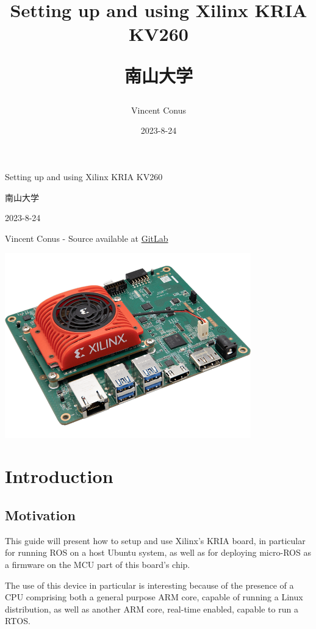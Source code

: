 \documentclass[10pt]{article}
\author{Vincent Conus}
\date{2023-8-24}
\title{Setting up and using Xilinx KRIA KV260\\\medskip
\large \begin{CJK}{UTF8}{min}南山大学\end{CJK}}
\newcommand{\gitlab}[1]{%
\href{#1}{GitLab \faGitlab}}
\begin{document}
\begin{titlepage}
\centering
{\LARGE Setting up and using Xilinx KRIA KV260 \par }
\vspace{5mm}
{\large \begin{CJK}{UTF8}{min}南山大学\end{CJK} \par}
\vspace{1cm}
{\large 2023-8-24 \par}
\vspace{2cm}
{\large Vincent Conus -  Source available at \gitlab{https://gitlab.com/sunoc/xilinx-kria-kv260-documentation} \par}
\vspace{3cm}
\includegraphics[width=0.8\textwidth]{./img/board}\end{titlepage}
\tableofcontents
\pagebreak
\section{Introduction}
\label{sec:org70d8d1a}

\subsection{Motivation}
\label{sec:orgefbf2f3}
This guide will present how to setup and use Xilinx's KRIA board, in particular
for running ROS on a host Ubuntu system, as well as for deploying
micro-ROS as a firmware on the MCU part of this board's chip.

The use of this device in particular is interesting because of the presence
of a CPU comprising both a general purpose ARM core, capable of running
a Linux distribution, as well as another ARM core, real-time enabled,
capable to run a RTOS.
\end{document}
